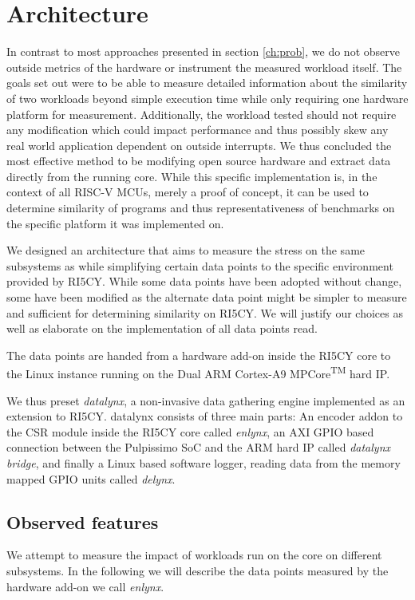 \documentclass[../bachelor_paper.tex]{subfiles}
\begin{document}
\chapter{Architecture}
    \label{ch:arch}
In contrast to most approaches presented in section \ref{ch:prob}, we do not observe outside metrics of the hardware or instrument the measured workload itself. The goals set out were to be able to measure detailed information about the similarity of two workloads beyond simple execution time while only requiring one hardware platform for measurement. Additionally, the workload tested should not require any modification which could impact performance and thus possibly skew any real world application dependent on outside interrupts. We thus concluded the most effective method to be modifying open source hardware and extract data directly from the running core. While this specific implementation is, in the context of all RISC-V \acp{MCU}, merely a proof of concept, it can be used to determine similarity of programs and thus representativeness of benchmarks on the specific platform it was implemented on.

We designed an architecture that aims to measure the stress on the same subsystems as \cite{phansalkarMeasuringProgramSimilarity2005,joshiMeasuringBenchmarkSimilarity2006,eeckhoutQuantifyingImpactInput} while simplifying certain data points to the specific environment provided by RI5CY. While some data points have been adopted without change, some have been modified as the alternate data point might be simpler to measure and sufficient for determining similarity on RI5CY. We will justify our choices as well as elaborate on the implementation of all data points read.

The data points are handed from a hardware add-on inside the RI5CY core to the Linux instance running on the Dual ARM\textsuperscript{\textregistered} Cortex\textsuperscript{\textregistered}-A9 MPCore\textsuperscript{TM} hard \ac{IP}.

We thus preset \emph{datalynx}, a non-invasive data gathering engine implemented as an extension to RI5CY. datalynx consists of three main parts: An encoder addon to the \ac{CSR} module inside the RI5CY core called \emph{enlynx}, an AXI GPIO based connection between the Pulpissimo \ac{SoC} and the ARM\textsuperscript{\textregistered} hard \ac{IP} called \emph{datalynx bridge}, and finally a Linux based software logger, reading data from the memory mapped GPIO units called \emph{delynx}.

\section{Observed features}
We attempt to measure the impact of workloads run on the core on different subsystems. In the following we will describe the data points measured by the hardware add-on we call \emph{enlynx}.
\end{document}
